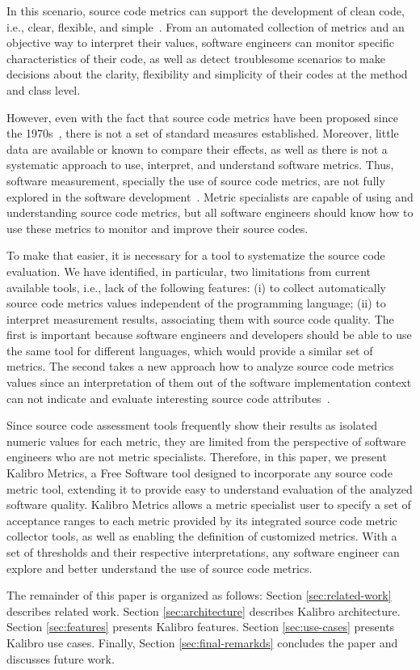 In this scenario, source code metrics can support the development of clean code,
i.e., clear, flexible, and simple~\cite{martin2008}.
%
From an automated collection of metrics and an objective way to interpret their
values, software engineers can monitor specific characteristics of their code,
as well as detect troublesome scenarios to make decisions about the clarity,
flexibility and simplicity of their codes at the method and class level.

However, even with the fact that source code metrics have been proposed since the
1970s~\cite{SEI88}, there is not a set of standard measures established.
%
Moreover, little data are available or known to compare their effects,
as well as there is not a systematic approach to use, interpret, and
understand software metrics.
%
Thus, software measurement, specially the use of source code
metrics, are not fully explored in the software development~\cite{Tempero2008}.
%
Metric specialists are capable of using and understanding source code
metrics, but all software engineers should know how to use these metrics to
monitor and improve their source codes.

To make that easier, it is necessary for a tool to systematize the
source code evaluation.
%
We have identified, in particular, two limitations from current available tools,
i.e., lack of the following features:
%
(i) to collect automatically source code metrics values independent of the
programming language;  
(ii) to interpret measurement results, associating them with source code
quality.
%
The first is important because software engineers and developers should be able
to use the same tool for different languages, which would provide a similar set
of metrics.
%
The second takes a new approach how to analyze source code metrics values
since an interpretation of them out of the software implementation context can
not indicate and evaluate interesting source code attributes~\cite{SEI88}.


Since source code assessment tools frequently show their results as 
isolated numeric values for each metric, they are limited from the
perspective of software engineers who are not metric specialists. 
%
Therefore, in this paper, we present Kalibro Metrics, a Free Software tool
designed to incorporate any source code metric tool, extending it to provide
easy to understand evaluation of the analyzed software quality.
%
Kalibro Metrics allows a metric specialist user to specify a set of
acceptance ranges to each metric provided by its integrated source code metric
collector tools, as well as enabling the definition of customized metrics.
%
With a set of thresholds and their respective interpretations, any software
engineer can explore and better understand the use of source code metrics. 

The remainder of this paper is organized as follows:
%
%
Section \ref{sec:related-work} describes related work.
%
Section \ref{sec:architecture} describes Kalibro architecture.
%
Section \ref{sec:features} presents Kalibro features.
%
Section \ref{sec:use-cases} presents Kalibro use cases.
%
Finally, Section \ref{sec:final-remarkds} concludes the paper and discusses
future work.
